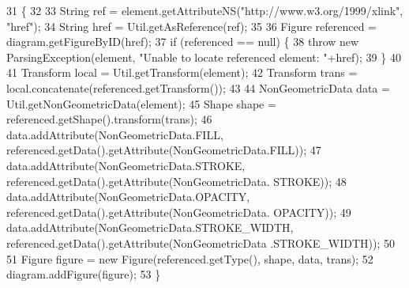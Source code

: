 \begin{DoxyCode}
31                                                          \{
32 
33         String ref = element.getAttributeNS(\textcolor{stringliteral}{"http://www.w3.org/1999/xlink"}, \textcolor{stringliteral}{"href"});
34         String href = Util.getAsReference(ref);
35         
36         Figure referenced = diagram.getFigureByID(href);
37         \textcolor{keywordflow}{if} (referenced == null) \{
38             \textcolor{keywordflow}{throw} \textcolor{keyword}{new} ParsingException(element, \textcolor{stringliteral}{"Unable to locate referenced element: "}+href);
39         \}
40         
41         Transform local = Util.getTransform(element);
42         Transform trans = local.concatenate(referenced.getTransform());
43         
44         NonGeometricData data = Util.getNonGeometricData(element);
45         Shape shape = referenced.getShape().transform(trans);
46         data.addAttribute(NonGeometricData.FILL, referenced.getData().getAttribute(NonGeometricData.FILL));
47         data.addAttribute(NonGeometricData.STROKE, referenced.getData().getAttribute(NonGeometricData.
      STROKE));
48         data.addAttribute(NonGeometricData.OPACITY, referenced.getData().getAttribute(NonGeometricData.
      OPACITY));
49         data.addAttribute(NonGeometricData.STROKE\_WIDTH, referenced.getData().getAttribute(NonGeometricData
      .STROKE\_WIDTH));
50         
51         Figure figure = \textcolor{keyword}{new} Figure(referenced.getType(), shape, data, trans);
52         diagram.addFigure(figure);
53     \}
\end{DoxyCode}
